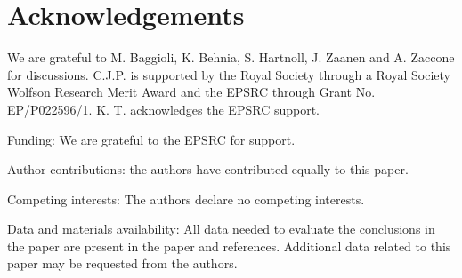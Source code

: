 \documentclass[aps,prl,groupedaddress,fleqn,twocolumn,10pt]{revtex4-1}
\begin{document}
\section{Acknowledgements}

We are grateful to M. Baggioli, K. Behnia, S. Hartnoll, J. Zaanen and A. Zaccone for discussions. C.J.P. is supported by the Royal Society through a Royal Society Wolfson Research Merit Award and the EPSRC through Grant No. EP/P022596/1. K. T. acknowledges the EPSRC support.

Funding: We are grateful to the EPSRC for support.

Author contributions: the authors have contributed equally to this paper.

Competing interests: The authors declare no competing interests.

Data and materials availability: All data needed to evaluate the conclusions in the paper are present in the paper and references. Additional data related to this paper may be requested from the authors.
\end{document}
